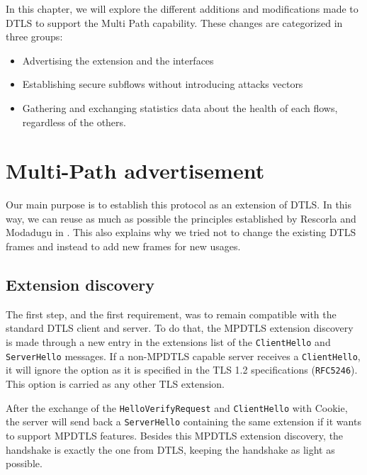\documentclass[11pt,a4paper,oldfontcommands]{memoir}
\begin{document}
In this chapter, we will explore the different additions and modifications made to DTLS to support the Multi Path capability. These changes are categorized in three groups:
\begin{itemize}
\item Advertising the extension and the interfaces
\item Establishing secure subflows without introducing attacks vectors
\item Gathering and exchanging statistics data about the health of each flows, regardless of the others. 
\end{itemize}


\section{Multi-Path advertisement}

Our main purpose is to establish this protocol as an extension of DTLS. In this way, we can reuse as much as possible the principles established by Rescorla and Modadugu in \cite{modadugu2004design}. This also explains why we tried not to change the existing DTLS frames and instead to add new frames for new usages.

\subsection{Extension discovery}

The first step, and the first requirement, was to remain compatible with the standard DTLS client and server. To do that, the MPDTLS extension discovery is made through a new entry in the extensions list of the \verb!ClientHello! and \verb!ServerHello! messages. If a non-MPDTLS capable server receives a \verb!ClientHello!, it will ignore the option  as it is specified in the TLS 1.2 specifications (\verb!RFC5246!). This option is carried as any other TLS extension.


After the exchange of the \verb!HelloVerifyRequest! and \verb!ClientHello! with Cookie, the server will send back a \verb!ServerHello! containing the same extension if it wants to support MPDTLS features. Besides this MPDTLS extension discovery, the handshake is exactly the one from DTLS, keeping the handshake as light as possible.
\end{document}
